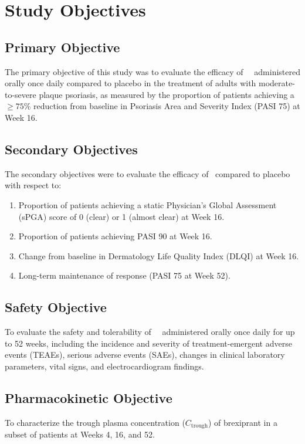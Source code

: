 \section{Study Objectives}

\subsection{Primary Objective}

The primary objective of this study was to evaluate the efficacy of \studydrug\ \studydose\ administered orally once daily compared to placebo in the treatment of adults with moderate-to-severe plaque psoriasis, as measured by the proportion of patients achieving a $\ge 75\%$ reduction from baseline in Psoriasis Area and Severity Index (PASI 75) at Week 16.

\subsection{Secondary Objectives}

The secondary objectives were to evaluate the efficacy of \studydrug\ compared to placebo with respect to:

\begin{enumerate}[label=\arabic*.]
  \item Proportion of patients achieving a static Physician's Global Assessment (sPGA) score of 0 (clear) or 1 (almost clear) at Week 16.
  \item Proportion of patients achieving PASI 90 at Week 16.
  \item Change from baseline in Dermatology Life Quality Index (DLQI) at Week 16.
  \item Long-term maintenance of response (PASI 75 at Week 52).
\end{enumerate}

\subsection{Safety Objective}

To evaluate the safety and tolerability of \studydrug\ \studydose\ administered orally once daily for up to 52 weeks, including the incidence and severity of treatment-emergent adverse events (TEAEs), serious adverse events (SAEs), changes in clinical laboratory parameters, vital signs, and electrocardiogram findings.

\subsection{Pharmacokinetic Objective}

To characterize the trough plasma concentration ($C_{\text{trough}}$) of brexiprant in a subset of patients at Weeks 4, 16, and 52.

\newpage

